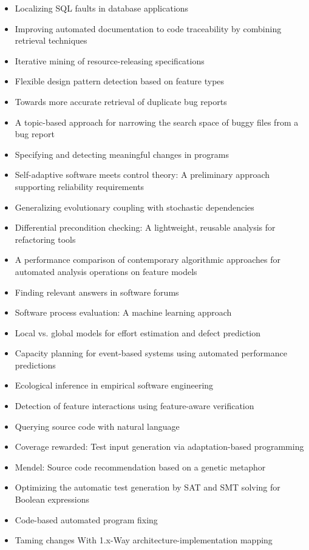 {\begin{itemize}[itemsep=-1ex]
  \item Localizing SQL faults in database applications
  \item Improving automated documentation to code traceability by combining retrieval techniques
  \item Iterative mining of resource-releasing specifications
  \item Flexible design pattern detection based on feature types
  \item Towards more accurate retrieval of duplicate bug reports
  \item A topic-based approach for narrowing the search space of buggy files from a bug report
  \item Specifying and detecting meaningful changes in programs
  \item Self-adaptive software meets control theory: A preliminary approach supporting reliability requirements
  \item Generalizing evolutionary coupling with stochastic dependencies
  \item Differential precondition checking: A lightweight, reusable analysis for refactoring tools
  \item A performance comparison of contemporary algorithmic approaches for automated analysis operations on feature models
  \item Finding relevant answers in software forums
  \item Software process evaluation: A machine learning approach
  \item Local vs. global models for effort estimation and defect prediction
  \item Capacity planning for event-based systems using automated performance predictions
  \item Ecological inference in empirical software engineering
  \item Detection of feature interactions using feature-aware verification
  \item Querying source code with natural language
  \item Coverage rewarded: Test input generation via adaptation-based programming
  \item Mendel: Source code recommendation based on a genetic metaphor
  \item Optimizing the automatic test generation by SAT and SMT solving for Boolean expressions
  \item Code-based automated program fixing
  \item Taming changes With 1.x-Way architecture-implementation mapping

\end{itemize}}
